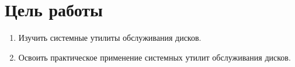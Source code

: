 \section{Цель работы}

\begin{enumerate}
  \item Изучить системные утилиты обслуживания дисков.
  \item Освоить практическое применение системных утилит обслуживания дисков. 
\end{enumerate}


